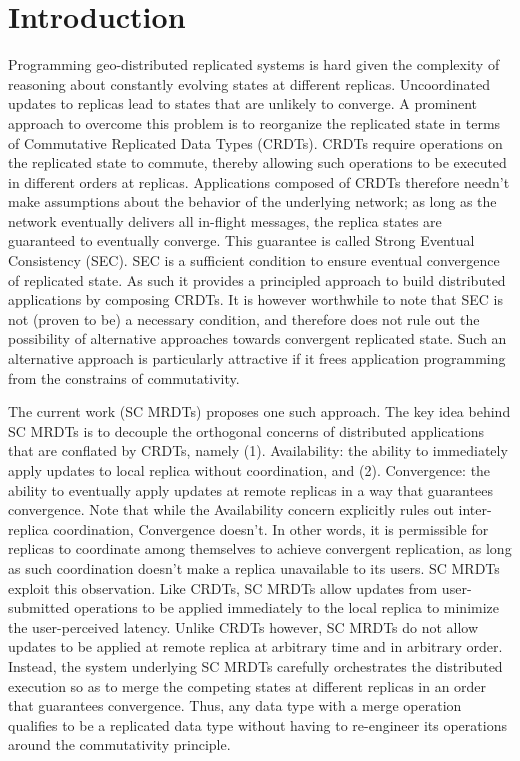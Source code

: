 \section{Introduction}

Programming geo-distributed replicated systems is hard given the complexity
of reasoning about constantly evolving states at different replicas.
Uncoordinated updates to replicas lead to states that are unlikely to
converge. A prominent approach to overcome this problem is to reorganize
the replicated state in terms of Commutative Replicated Data Types (CRDTs).
CRDTs require operations on the replicated state to commute, thereby
allowing such operations to be executed in different orders at replicas.
Applications composed of CRDTs therefore needn’t make assumptions about the
behavior of the underlying network; as long as the network eventually
delivers all in-flight messages, the replica states are guaranteed to
eventually converge. This guarantee is called Strong Eventual Consistency
(SEC). SEC is a sufficient condition to ensure eventual convergence of
replicated state. As such it provides a principled approach to build
distributed applications by composing CRDTs. It is however worthwhile to
note that SEC is not (proven to be) a necessary condition, and therefore
does not rule out the possibility of alternative approaches towards
convergent replicated state. Such an alternative approach is particularly
attractive if it frees application programming from the constrains of
commutativity.

The current work (SC MRDTs) proposes one such approach. The key idea behind
SC MRDTs is to decouple the orthogonal concerns of distributed applications
that are conflated by CRDTs, namely (1). Availability: the ability to
immediately apply updates to local replica without coordination, and (2).
Convergence: the ability to eventually apply updates at remote replicas in
a way that guarantees convergence. Note that while the Availability concern
explicitly rules out inter-replica coordination, Convergence doesn’t. In
other words, it is permissible for replicas to coordinate among themselves
to achieve convergent replication, as long as such coordination doesn’t
make a replica unavailable to its users.  SC MRDTs exploit this
observation. Like CRDTs, SC MRDTs allow updates from user-submitted
operations to be applied immediately to the local replica to minimize the
user-perceived latency. Unlike CRDTs however, SC MRDTs do not allow updates
to be applied at remote replica at arbitrary time and in arbitrary order.
Instead, the system underlying SC MRDTs carefully orchestrates the
distributed execution so as to merge the competing states at different
replicas in an order that guarantees convergence. Thus, any data type with
a merge operation qualifies to be a replicated data type without having to
re-engineer its operations around the commutativity principle. 
